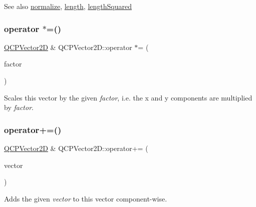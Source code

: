 \begin{DoxySeeAlso}{See also}
\mbox{\hyperlink{class_q_c_p_vector2_d_ad83268be370685c2a0630acc0fb1a425}{normalize}}, \mbox{\hyperlink{class_q_c_p_vector2_d_a10adb5ab031fe94f0b64a3c5aefb552e}{length}}, \mbox{\hyperlink{class_q_c_p_vector2_d_a766585459d84cb149334fda1a498b2e5}{length\+Squared}} 
\end{DoxySeeAlso}
\mbox{\label{class_q_c_p_vector2_d_a079f1159ca74168b52904392a7bf304c}} 
\subsubsection{\texorpdfstring{operator $\ast$=()}{operator *=()}}
{\footnotesize\ttfamily \mbox{\hyperlink{class_q_c_p_vector2_d}{Q\+C\+P\+Vector2D}} \& Q\+C\+P\+Vector2\+D\+::operator $\ast$= (\begin{DoxyParamCaption}\item[{double}]{factor }\end{DoxyParamCaption})}

Scales this vector by the given {\itshape factor}, i.\+e. the x and y components are multiplied by {\itshape factor}. \mbox{\label{class_q_c_p_vector2_d_aa2c34754ce8839b2d074dec741783c5e}} 
\subsubsection{\texorpdfstring{operator+=()}{operator+=()}}
{\footnotesize\ttfamily \mbox{\hyperlink{class_q_c_p_vector2_d}{Q\+C\+P\+Vector2D}} \& Q\+C\+P\+Vector2\+D\+::operator+= (\begin{DoxyParamCaption}\item[{const \mbox{\hyperlink{class_q_c_p_vector2_d}{Q\+C\+P\+Vector2D}} \&}]{vector }\end{DoxyParamCaption})}

Adds the given {\itshape vector} to this vector component-\/wise. \mbox{\label{class_q_c_p_vector2_d_a3a2e906bb924983bb801e89f28a3d566}} 

